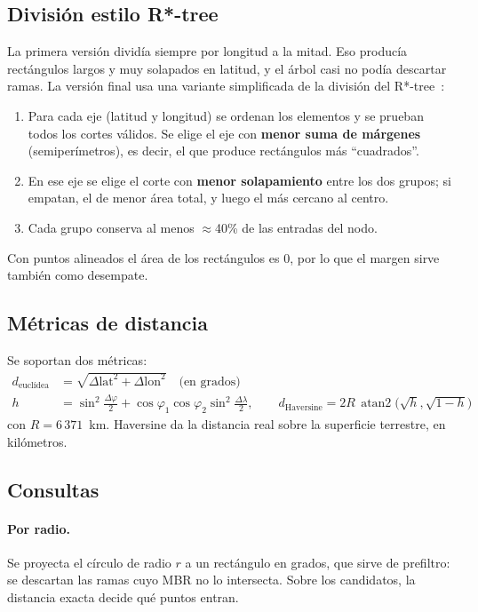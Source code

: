 \documentclass[11pt,a4paper]{article}
\begin{document}
\subsection{División estilo R*-tree}

La primera versión dividía siempre por longitud a la mitad. Eso producía rectángulos largos y muy solapados en latitud, y el árbol casi no podía descartar ramas. La versión final usa una variante simplificada de la división del R*-tree~\cite{beckmann1990}:

\begin{enumerate}
  \item Para cada eje (latitud y longitud) se ordenan los elementos y se prueban todos los cortes válidos. Se elige el eje con \textbf{menor suma de márgenes} (semiperímetros), es decir, el que produce rectángulos más ``cuadrados''.
  \item En ese eje se elige el corte con \textbf{menor solapamiento} entre los dos grupos; si empatan, el de menor área total, y luego el más cercano al centro.
  \item Cada grupo conserva al menos $\approx$40\% de las entradas del nodo.
\end{enumerate}

Con puntos alineados el área de los rectángulos es 0, por lo que el margen sirve también como desempate.

\subsection{Métricas de distancia}

Se soportan dos métricas:
\begin{align*}
  d_{\text{euclídea}} &= \sqrt{\Delta\text{lat}^2 + \Delta\text{lon}^2} \quad\text{(en grados)}\\[2pt]
  h &= \sin^2\!\tfrac{\Delta\varphi}{2} + \cos\varphi_1\cos\varphi_2\sin^2\!\tfrac{\Delta\lambda}{2},
  \qquad d_{\text{Haversine}} = 2R\,\operatorname{atan2}\!\big(\sqrt{h},\sqrt{1-h}\big)
\end{align*}
con $R = 6\,371$~km. Haversine da la distancia real sobre la superficie terrestre, en kilómetros.

\subsection{Consultas}

\paragraph{Por radio.} Se proyecta el círculo de radio $r$ a un rectángulo en grados, que sirve de prefiltro: se descartan las ramas cuyo MBR no lo intersecta. Sobre los candidatos, la distancia exacta decide qué puntos entran.
\end{document}
